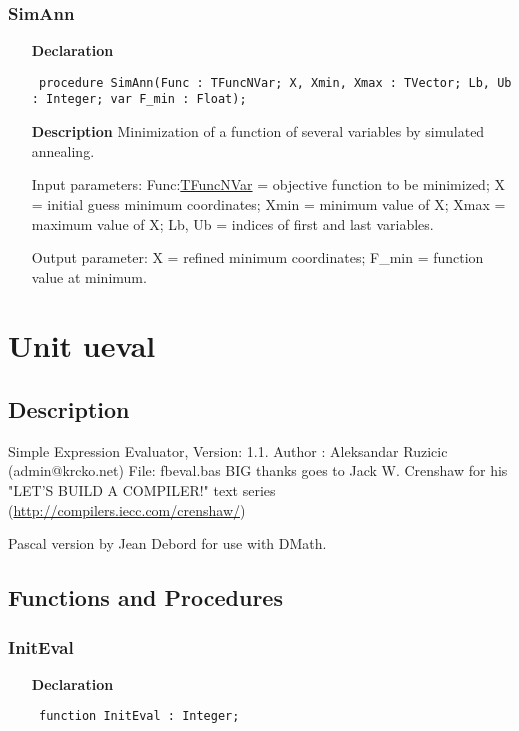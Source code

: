 \documentclass[12pt,a4paper,oneside]{report}
\newcommand{\declarationitem}[1]{\textbf{#1}}
\newcommand{\descriptiontitle}[1]{\textbf{#1}}
\newcommand{\code}[1]{\texttt{#1}}
\begin{document}
\subsubsection{SimAnn}
\label{usimann-SimAnn}
\begin{itemize}\item[\declarationitem{Declaration}\hfill]
	\begin{flushleft}
		\code{
			procedure SimAnn(Func : TFuncNVar; X, Xmin, Xmax : TVector; Lb, Ub : Integer; var F{\_}min : Float);}
		
	\end{flushleft}
	
	\par
	\item[\descriptiontitle{Description}]
	Minimization of a function of several variables by simulated annealing.
	
	Input parameters: Func:\hyperref[utypes-TFuncNVar]{TFuncNVar} = objective function to be minimized; X = initial guess minimum coordinates; Xmin = minimum value of X; Xmax = maximum value of X; Lb, Ub = indices of first and last variables.
	
	Output parameter: X = refined minimum coordinates; F{\_}min = function value at minimum.
	
\end{itemize}

\section{Unit ueval}
\label{ueval}
\subsection{Description}
Simple Expression Evaluator, Version: 1.1.
Author : Aleksandar Ruzicic (admin@krcko.net) File: fbeval.bas
BIG thanks goes to Jack W. Crenshaw for his "LET'S BUILD A COMPILER!" text series\\ (\href{http://compilers.iecc.com/crenshaw/}{http://compilers.iecc.com/crenshaw/})

Pascal version by Jean Debord for use with DMath.
\subsection{Functions and Procedures}
\subsubsection{InitEval}
\label{ueval-InitEval}
\begin{itemize}\item[\declarationitem{Declaration}\hfill]
	\begin{flushleft}
		\code{
			function InitEval : Integer;}
	\end{flushleft}
\end{itemize}
\end{document}
